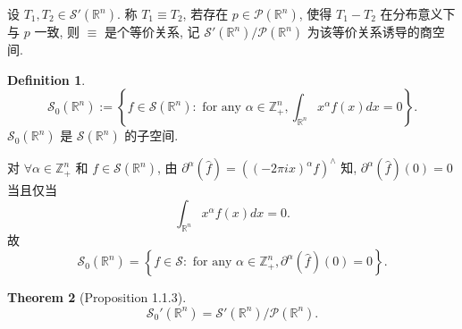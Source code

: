 \documentclass[a4paper,11pt]{article}
\newtheorem{theorem}{Theorem}[section]
\theoremstyle{definition}
\newtheorem{definition}[theorem]{Definition}
\begin{document}
设 $ T_1, T_2 \in \mathcal{S}'(\mathbb{R}^n) $. 称 $ T_1 \equiv T_2 $, 
若存在 $ p \in \mathcal{P}(\mathbb{R}^n) $, 使得 $ T_1 - T_2 $ 在分布意义下与 $ p $ 一致,
则 $ \equiv $ 是个等价关系, 记 $ \mathcal{S}'(\mathbb{R}^n)/ \mathcal{P}(\mathbb{R}^n) $ 为该等价关系诱导的商空间.


\begin{definition}
    $$
        \mathcal{S}_0(\mathbb{R}^n) 
            := \left\{ f \in \mathcal{S}(\mathbb{R}^n) :
                 \text{ for any } \alpha \in \mathbb{Z}_+^n, \int_{\mathbb{R}^n} x^\alpha f(x) dx = 0 \right\}.
    $$
    $ \mathcal{S}_0(\mathbb{R}^n) $ 是 $ \mathcal{S}(\mathbb{R}^n) $ 的子空间.
\end{definition} 



对 $ \forall \alpha \in \mathbb{Z}_+^n $ 和 $ f \in \mathcal{S}(\mathbb{R}^n) $,
由 $ \partial^\alpha (\hat{f}) = ((-2 \pi i x)^\alpha f)^\wedge $ 知, 
$ \partial^\alpha (\hat{f}) (0) = 0 $ 当且仅当
$$
    \int_{\mathbb{R}^n} x^\alpha f(x) dx = 0.
$$
故
$$
    \mathcal{S}_0(\mathbb{R}^n) 
        = \left\{ f \in \mathcal{S} :
             \text{ for any } \alpha \in \mathbb{Z}_+^n, \partial^\alpha (\hat{f}) (0) = 0 \right\}.
$$

\begin{theorem}[Proposition 1.1.3]
    $$
        \mathcal{S}_0'(\mathbb{R}^n) = \mathcal{S}'(\mathbb{R}^n) / \mathcal{P}(\mathbb{R}^n).
    $$
\end{theorem}
\end{document}
